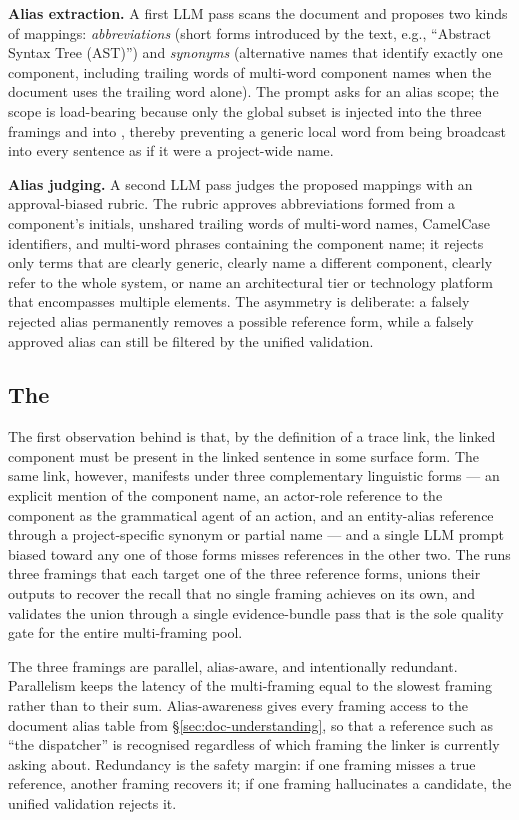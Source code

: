 \textbf{Alias extraction.}
A first LLM pass scans the document and proposes two kinds of
mappings: \emph{abbreviations} (short forms introduced by the text,
e.g., ``Abstract Syntax Tree (AST)'') and \emph{synonyms}
(alternative names that identify exactly one component, including
trailing words of multi-word component names when the document uses
the trailing word alone).
The prompt asks for an alias scope; the scope is load-bearing
because only the global subset is injected into the three framings
and into \coref, thereby preventing a generic local word from being
broadcast into every sentence as if it were a project-wide name.

\textbf{Alias judging.}
A second LLM pass judges the proposed mappings with an
approval-biased rubric.
The rubric approves abbreviations formed from a component's
initials, unshared trailing words of multi-word names, CamelCase
identifiers, and multi-word phrases containing the component name;
it rejects only terms that are clearly generic, clearly name a
different component, clearly refer to the whole system, or name an
architectural tier or technology platform that encompasses
multiple elements.
The asymmetry is deliberate: a falsely rejected alias permanently
removes a possible reference form, while a falsely approved alias
can still be filtered by the unified validation.

\subsection{The \multiframing}\label{sec:multiframing}

The first observation behind \approach is that, by the definition
of a trace link, the linked component must be present in the linked
sentence in some surface form.
The same link, however, manifests under three complementary
linguistic forms --- an explicit mention of the component name, an
actor-role reference to the component as the grammatical agent of
an action, and an entity-alias reference through a project-specific
synonym or partial name --- and a single LLM prompt biased toward
any one of those forms misses references in the other two.
The \multiframing runs three framings that each target one of the
three reference forms, unions their outputs to recover the
recall that no single framing achieves on its own, and validates
the union through a single evidence-bundle pass that is the sole
quality gate for the entire multi-framing pool.

The three framings are parallel, alias-aware, and intentionally
redundant.
Parallelism keeps the latency of the multi-framing equal to the
slowest framing rather than to their sum.
Alias-awareness gives every framing access to the document alias
table from \S\ref{sec:doc-understanding}, so that a reference such
as ``the dispatcher'' is recognised regardless of which framing
the linker is currently asking about.
Redundancy is the safety margin: if one framing misses a true
reference, another framing recovers it; if one framing hallucinates
a candidate, the unified validation rejects it.


